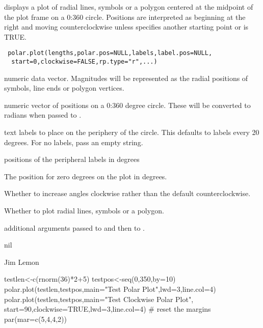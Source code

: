 \begin{Description}\relax
{} displays a plot of radial lines, symbols or a polygon 
centered at the midpoint of the plot frame on a 0:360 circle.
Positions are interpreted as beginning at the right and moving
counterclockwise unless  specifies another starting point or
 is TRUE.
\end{Description}
\begin{Usage}
\begin{verbatim}
 polar.plot(lengths,polar.pos=NULL,labels,label.pos=NULL,
  start=0,clockwise=FALSE,rp.type="r",...)
\end{verbatim}
\end{Usage}
\begin{Arguments}
\begin{ldescription}
\item[\code{lengths}] numeric data vector. Magnitudes will be represented as
the radial positions of symbols, line ends or polygon vertices.
\item[\code{polar.pos}] numeric vector of positions on a 0:360 degree circle.
These will be converted to radians when passed to .
\item[\code{labels}] text labels to place on the periphery of the circle. This 
defaults to labels every 20 degrees. For no labels, pass an empty string.
\item[\code{label.pos}] positions of the peripheral labels in degrees
\item[\code{start}] The position for zero degrees on the plot in degrees.
\item[\code{clockwise}] Whether to increase angles clockwise rather than the
default counterclockwise.
\item[\code{rp.type}] Whether to plot radial lines, symbols or a polygon.
\item[\code{...}] additional arguments passed to  and
then to .
\end{ldescription}
\end{Arguments}
\begin{Value}
nil
\end{Value}
\begin{Author}\relax
Jim Lemon
\end{Author}
\begin{SeeAlso}\relax
{}
\end{SeeAlso}
\begin{Examples}
\begin{ExampleCode}
 testlen<-c(rnorm(36)*2+5)
 testpos<-seq(0,350,by=10)
 polar.plot(testlen,testpos,main="Test Polar Plot",lwd=3,line.col=4)
 polar.plot(testlen,testpos,main="Test Clockwise Polar Plot",
  start=90,clockwise=TRUE,lwd=3,line.col=4)
 # reset the margins
 par(mar=c(5,4,4,2))
\end{ExampleCode}
\end{Examples}

